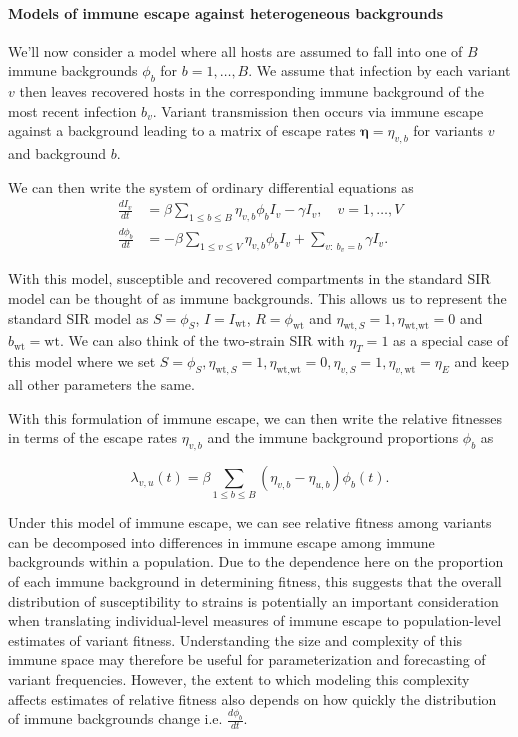 \documentclass[12pt,oneside,letterpaper]{article}
\renewcommand{\vec}[1]{\boldsymbol{#1}}
\newcommand{\wt}{\text{wt}}
\begin{document}
\paragraph{Models of immune escape against heterogeneous backgrounds}%

We'll now consider a model where all hosts are assumed to fall into one of $B$ immune backgrounds $\phi_{b}$ for $b =1, \ldots, B$.
We assume that infection by each variant $v$ then leaves recovered hosts in the corresponding immune background of the most recent infection $b_{v}$.
Variant transmission then occurs via immune escape against a background leading to a matrix of escape rates $\vec{\eta} = \eta_{v,b}$ for variants $v$ and background $b$.

We can then write the system of ordinary differential equations as
\begin{align*}
    \frac{d I_{v}}{dt} &= \beta \sum_{1\leq b \leq B} \eta_{v, b} \phi_{b} I_{v} - \gamma I_{v}, \quad v = 1, \ldots, V\\
    \frac{d \phi_{b}}{dt} &= - \beta \sum_{1\leq v \leq V} \eta_{v,b}\phi_{b} I_{v} +  \sum_{v:\ b_{v} = b} \gamma I_{v}.
\end{align*}

With this model, susceptible and recovered compartments in the standard SIR model can be thought of as immune backgrounds.
This allows us to represent the standard SIR model as $S = \phi_{S}$, $I = I_{\wt}$, $R = \phi_{\wt}$ and $\eta_{\wt, S} = 1, \eta_{\wt, \wt} = 0$ and $b_{\wt} = \wt$.
We can also think of the two-strain SIR with $\eta_{T} = 1$ as a special case of this model where we set $S = \phi_{S}, \eta_{\wt, S} = 1, \eta_{\wt, \wt} = 0, \eta_{v, S} = 1, \eta_{v, \wt} = \eta_{E}$ and keep all other parameters the same.

With this formulation of immune escape, we can then write the relative fitnesses in terms of the escape rates $\eta_{v,b}$ and the immune background proportions $\phi_{b}$ as

\begin{equation} \label{eq:escape_relative_fitness}
    \lambda_{v, u}(t) = \beta \sum_{1\leq b \leq B}(\eta_{v,b} - \eta_{u,b}) \phi_{b}(t).
\end{equation}

Under this model of immune escape, we can see relative fitness among variants can be decomposed into differences in immune escape among immune backgrounds within a population.
Due to the dependence here on the proportion of each immune background in determining fitness, this suggests that the overall distribution of susceptibility to strains is potentially an important consideration when translating individual-level measures of immune escape to population-level estimates of variant fitness.
Understanding the size and complexity of this immune space may therefore be useful for parameterization and forecasting of variant frequencies.
However, the extent to which modeling this complexity affects estimates of relative fitness also depends on how quickly the distribution of immune backgrounds change i.e. $\frac{d\phi_{b}}{dt}$.
\end{document}
